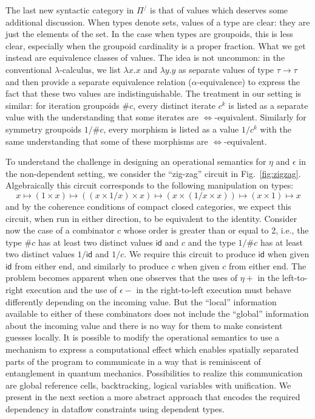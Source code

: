 \documentclass[a4paper,USenglish]{lipics-v2016-utf8x}
\newcommand{\hash}{\#}
\newcommand{\isotwo}{\Leftrightarrow}
\newcommand{\order}[1]{\hash #1}
\newcommand{\iorder}[1]{1/\hash #1}
\newcommand{\idiso}{\mathsf{{id}}}
\begin{document}
The last new syntactic category in $\Pi^/$ is that of values which deserves some
additional discussion. When types denote sets, values of a type are clear: they
are just the elements of the set.  In the case when types are groupoids, this is
less clear, especially when the groupoid cardinality is a proper fraction.  What
we get instead are equivalence classes of values.  The idea is not uncommon: in
the conventional $\lambda$-calculus, we list $\lambda x.x$ and $\lambda y.y$ as
separate values of type $\tau \rightarrow \tau$ and then provide a separate
equivalence relation ($\alpha$-equivalence) to express the fact that these two
values are indistinguishable. The treatment in our setting is similar: for
iteration groupoids $\order{c}$, every distinct iterate $c^k$ is listed as a
separate value with the understanding that some iterates are
$\isotwo$-equivalent. Similarly for symmetry groupoids $\iorder{c}$, every
morphism is listed as a value $1/c^k$ with the same understanding that some of
these morphisms are $\isotwo$-equivalent.

To understand the challenge in designing an operational semantics for $\eta$ and
$\epsilon$ in the non-dependent setting, we consider the ``zig-zag'' circuit in
Fig.~\ref{fig:zigzag}. Algebraically this circuit corresponds to the following
manipulation on types:
\[
x \mapsto (1 \times x) \mapsto ((x \times 1/x) \times x)
\mapsto (x \times (1/x \times x)) \mapsto (x \times 1) \mapsto x
\]
and by the coherence conditions of compact closed categories, we expect this
circuit, when run in either direction, to be equivalent to the
identity. Consider now the case of a combinator $c$ whose order is greater than
or equal to 2, i.e., the type $\order{c}$ has at least two distinct values
$\idiso$ and $c$ and the type $\iorder{c}$ has at least two distinct values
$1/\idiso$ and $1/c$. We require this circuit to produce $\idiso$ when given
$\idiso$ from either end, and similarly to produce $c$ when given $c$ from
either end. The problem becomes apparent when one observes that the uses of
$\eta+$ in the left-to-right execution and the use of $\epsilon-$ in the
right-to-left execution must behave differently depending on the incoming
value. But the ``local'' information available to either of these combinators
does not include the ``global'' information about the incoming value and there
is no way for them to make consistent guesses locally. It is possible to modify
the operational semantics to use a mechanism to express a computational effect
which enables spatially separated parts of the program to communicate in a way
that is reminiscent of entanglement in quantum mechanics. Possibilities to
realize this communication are global reference cells, backtracking, logical
variables with unification. We present in the next section a more abstract
approach that encodes the required dependency in dataflow constraints using
dependent types.
\end{document}
